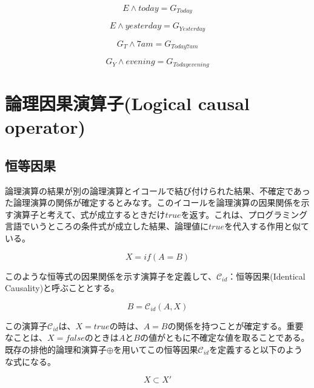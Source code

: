 \documentclass[12pt]{article}
\begin{document}
\begin{equation} E \wedge today = G_{Today}\end{equation}

\begin{equation} E \wedge yesterday = G_{Yesterday}\end{equation}

\begin{equation} G_T \wedge 7am = G_{Today7am}\end{equation}

\begin{equation} G_Y \wedge evening = G_{Todayevening}\end{equation}

\clearpage
\section{論理因果演算子(Logical causal
operator)}\label{ux8ad6ux7406ux56e0ux679cux6f14ux7b97ux5b50logical-causal-operator}

\subsection{恒等因果}\label{ux6052ux7b49ux56e0ux679c}

論理演算の結果が別の論理演算とイコールで結び付けられた結果、不確定であった論理演算の関係が確定するとみなす。このイコールを論理演算の因果関係を示す演算子と考えて、式が成立するときだけ\(true\)を返す。これは、プログラミング言語でいうところの条件式が成立した結果、論理値に\(true\)を代入する作用と似ている。

\begin{equation} X= if (A = B) \end{equation}

このような恒等式の因果関係を示す演算子を定義して、\(\mathcal{C}_{id}\)：恒等因果(Identical
Causality)と呼ぶこととする。

\begin{equation}B=\mathcal{C}_{id}(A , X)\end{equation}

この演算子\(\mathcal{C}_{id}\)は、\(X=true\)の時は、\(A = B\)の関係を持つことが確定する。重要なことは、\(X=false\)のときは\(A\)と\(B\)の値がともに不確定な値を取ることである。既存の排他的論理和演算子\(\oplus\)を用いてこの恒等因果\(\mathcal{C}_{id}\)を定義すると以下のような式になる。

\begin{equation} X \subset X'\end{equation}
\end{document}
